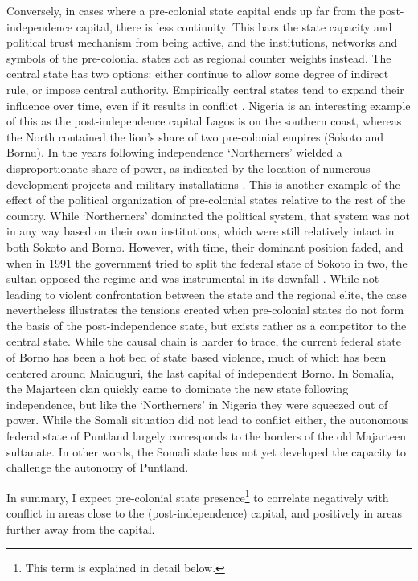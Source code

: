 \documentclass[12pt]{article}
\begin{document}
Conversely, in cases where a pre-colonial state capital ends up far from the
post-independence capital, there is less continuity. This bars the state
capacity and political trust mechanism from being active, and the institutions,
networks and symbols of the pre-colonial states act as regional counter weights
instead. The central state has two options: either continue to allow some degree
of indirect rule, or impose central authority. Empirically central states tend
to expand their influence over time, even if it results in conflict
\citep{Ying_2020}. Nigeria is an interesting example of this as the
post-independence capital Lagos is on the southern coast, whereas the North
contained the lion's share of two pre-colonial empires (Sokoto and Bornu). In
the years following independence `Northerners' wielded a disproportionate share
of power, as indicated by the location of numerous development projects and
military installations \citep{Bates2008a}. This is another example of the effect
of the political organization of pre-colonial states relative to the rest of the
country. While `Northerners' dominated the political system, that system was not
in any way based on their own institutions, which were still relatively intact
in both Sokoto and Borno. However, with time, their dominant position faded, and
when in 1991 the government tried to split the federal state of Sokoto in two,
the sultan opposed the regime and was instrumental in its downfall
\citep{HiribarrenVincent2017AHoB}. While not leading to violent confrontation
between the state and the regional elite, the case nevertheless illustrates the
tensions created when pre-colonial states do not form the basis of the
post-independence state, but exists rather as a competitor to the central state.
While the causal chain is harder to trace, the current federal state of Borno
has been a hot bed of state based violence, much of which has been centered
around Maiduguri, the last capital of independent Borno. In Somalia, the
Majarteen clan quickly came to dominate the new state following independence, but
like the `Northerners' in Nigeria they were squeezed out of power. While the
Somali situation did not lead to conflict either, the autonomous federal state
of Puntland largely corresponds to the borders of the old Majarteen sultanate.
In other words, the Somali state has not yet developed the capacity to challenge
the autonomy of Puntland. %

In summary, I expect pre-colonial state presence\footnote{This term is explained
in detail below.} to correlate negatively with conflict in areas close to the
(post-independence) capital, and positively in areas further away from the
capital.
\end{document}
